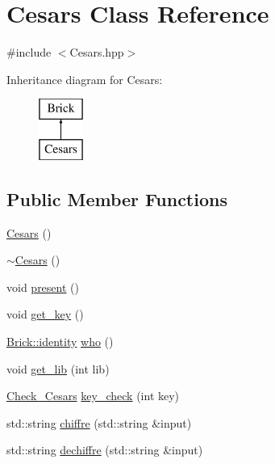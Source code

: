 \hypertarget{class_cesars}{}\section{Cesars Class Reference}
\label{class_cesars}


{\ttfamily \#include $<$Cesars.\+hpp$>$}

Inheritance diagram for Cesars\+:\begin{figure}[H]
\begin{center}
\leavevmode
\includegraphics[height=2.000000cm]{dc/dc3/class_cesars}
\end{center}
\end{figure}
\subsection*{Public Member Functions}
\begin{DoxyCompactItemize}
\item 
\hyperlink{class_cesars_ae1fd313aee7d4fc2e2d11cd38167c1d0}{Cesars} ()
\item 
\hyperlink{class_cesars_a23bc7dd430ac18950a25b2a7b2aa7a0a}{$\sim$\+Cesars} ()
\item 
void \hyperlink{class_cesars_aaea2ab4fe1a9eacb640352e0a2d4b422}{present} ()
\item 
void \hyperlink{class_cesars_a8b5bcf3d698a1e11c9e398a61d3a46fc}{get\+\_\+key} ()
\item 
\hyperlink{class_brick_af32354a4d8d1275db35660a96a2cfa3e}{Brick\+::identity} \hyperlink{class_cesars_a4bec14795caf7d1accc9312b04f57eca}{who} ()
\item 
void \hyperlink{class_cesars_a6f8403b49ea1315b95f831e52c22b3f6}{get\+\_\+lib} (int lib)
\item 
\hyperlink{_cesars_8hpp_a7b741beb5ba8737e6aaf6cb5417b9124}{Check\+\_\+\+Cesars} \hyperlink{class_cesars_a9ee84151de75d556612964ca5a88b690}{key\+\_\+check} (int key)
\item 
std\+::string \hyperlink{class_cesars_a0b166b0f93c0949e9f3422e8f6604baa}{chiffre} (std\+::string \&input)
\item 
std\+::string \hyperlink{class_cesars_a9375601dc5baac952212a5125a862a06}{dechiffre} (std\+::string \&input)
\end{DoxyCompactItemize}
